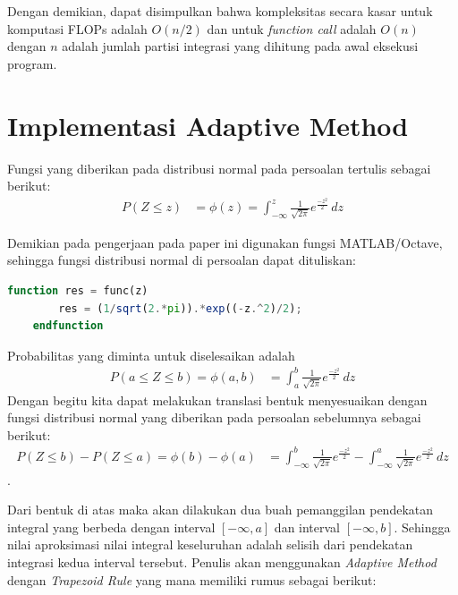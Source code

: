 \documentclass[journal,12pt,onecolumn,a4paper]{IEEEtran}
\begin{document}
Dengan demikian, dapat disimpulkan bahwa kompleksitas secara kasar untuk komputasi FLOPs adalah \(O(n/2)\) dan untuk \emph{function call} adalah \(O(n)\) dengan \(n\) adalah jumlah partisi integrasi yang dihitung pada awal eksekusi program.

\section{Implementasi Adaptive Method}
\par Fungsi yang diberikan pada distribusi normal pada persoalan tertulis sebagai berikut:
\begin{equation*}
	\begin{split}
		P(Z \le z ) & = \phi(z) = \int_{-\infty}^{z} \frac{1}{\sqrt{2\pi}}e ^{\frac{-z^2}{2}} \,dz
	\end{split}
\end{equation*}

\par Demikian pada pengerjaan pada paper ini digunakan fungsi MATLAB/Octave, sehingga fungsi distribusi normal di persoalan dapat dituliskan:
\begin{center}
	\begin{lstlisting}[language=Octave]
	function res = func(z)
		res = (1/sqrt(2.*pi)).*exp((-z.^2)/2);
	endfunction
	\end{lstlisting}
\end{center}

Probabilitas yang diminta untuk diselesaikan adalah
\begin{equation*}
	\begin{split}
		P(a \le Z \le b )  = \phi(a,b) & = \int_{a}^{b} \frac{1}{\sqrt{2\pi}}e ^{\frac{-z^2}{2}} \,dz
	\end{split}
\end{equation*}
Dengan begitu kita dapat melakukan translasi bentuk menyesuaikan dengan fungsi distribusi normal yang diberikan pada persoalan sebelumnya sebagai berikut:
\begin{equation*}
	\begin{split}
		P(Z \le b ) - P(Z \le a )  = \phi(b)-\phi(a) & =  \int_{-\infty}^{b} \frac{1}{\sqrt{2\pi}}e ^{\frac{-z^2}{2}} - \int_{-\infty}^{a} \frac{1}{\sqrt{2\pi}}e ^{\frac{-z^2}{2}} \,dz
	\end{split}
\end{equation*}.

Dari bentuk di atas maka akan dilakukan dua buah pemanggilan pendekatan integral yang berbeda dengan interval \([-\infty, a]\) dan interval \([-\infty, b]\). Sehingga nilai aproksimasi nilai integral keseluruhan adalah selisih dari pendekatan integrasi kedua interval tersebut.
Penulis akan menggunakan \emph{Adaptive Method} dengan \emph{Trapezoid Rule} yang mana memiliki rumus sebagai berikut:
\end{document}
